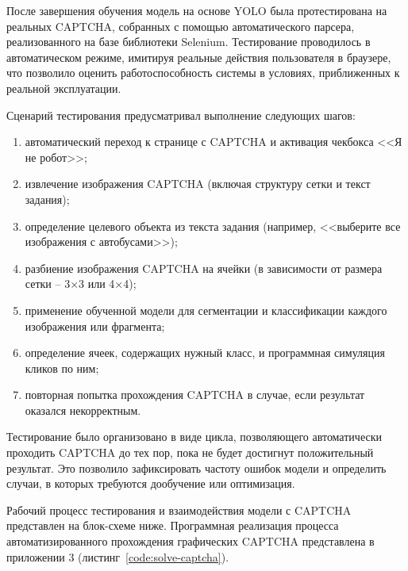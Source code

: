 После завершения обучения модель на основе YOLO была протестирована на реальных 
CAPTCHA, собранных с помощью автоматического парсера, реализованного на базе 
библиотеки Selenium. Тестирование проводилось в автоматическом режиме, имитируя 
реальные действия пользователя в браузере, что позволило оценить 
работоспособность системы в условиях, приближенных к реальной эксплуатации.

Сценарий тестирования предусматривал выполнение следующих шагов:

\begin{enumerate}
    \item автоматический переход к странице с CAPTCHA и активация чекбокса <<Я не 
    робот>>;
    \item извлечение изображения CAPTCHA (включая структуру сетки и текст 
    задания);
    \item определение целевого объекта из текста задания (например, <<выберите 
    все изображения с автобусами>>);
    \item разбиение изображения CAPTCHA на ячейки (в зависимости от размера сетки 
    -- 3×3 или 4×4);
    \item применение обученной модели для сегментации и классификации каждого 
    изображения или фрагмента;
    \item определение ячеек, содержащих нужный класс, и программная симуляция 
    кликов по ним;
    \item повторная попытка прохождения CAPTCHA в случае, если результат оказался 
    некорректным.
\end{enumerate}

Тестирование было организовано в виде цикла, позволяющего автоматически проходить 
CAPTCHA до тех пор, пока не будет достигнут положительный результат. Это 
позволило зафиксировать частоту ошибок модели и определить случаи, в которых 
требуются дообучение или оптимизация.

Рабочий процесс тестирования и взаимодействия модели с CAPTCHA представлен на 
блок-схеме ниже. Программная реализация процесса автоматизированного прохождения 
графических CAPTCHA представлена в приложении 3 (листинг~\ref{code:solve-captcha}).

